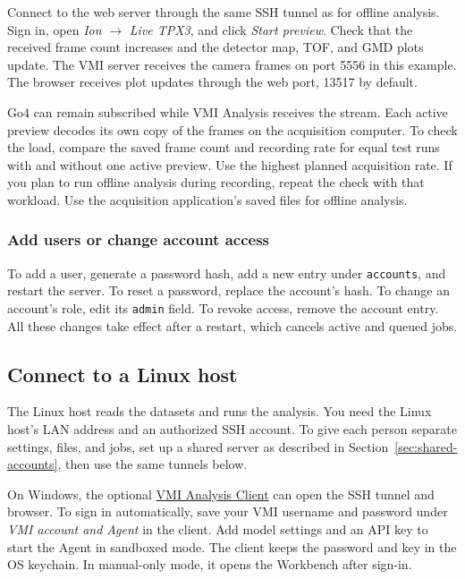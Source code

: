 \documentclass[11pt,a4paper]{article}
\newcommand{\code}[1]{\texttt{#1}}
\begin{document}
Connect to the web server through the same SSH tunnel as for offline analysis.
Sign in, open \emph{Ion} $\rightarrow$ \emph{Live TPX3}, and click
\emph{Start preview}. Check that the received frame count increases
and the detector map, TOF, and GMD plots update. The VMI server receives
the camera frames on port 5556 in this example. The browser receives plot
updates through the web port, 13517 by default.

Go4 can remain subscribed while VMI Analysis receives the stream.
Each active preview decodes its own copy of the frames on the acquisition computer.
To check the load, compare the saved frame count and recording rate for equal
test runs with and without one active preview. Use the highest planned
acquisition rate. If you plan to run offline analysis during recording,
repeat the check with that workload. Use the acquisition application's saved
files for offline analysis.

\subsubsection{Add users or change account access}

To add a user, generate a password hash, add a new entry under
\code{accounts}, and restart the server. To reset a password, replace the
account's hash. To change an account's role, edit its \code{admin} field.
To revoke access, remove the account entry. All these changes take effect
after a restart, which cancels active and queued jobs.

\subsection{Connect to a Linux host}
\label{sec:linux-mobaxterm}

The Linux host reads the datasets and runs the analysis. You need the
Linux host's LAN address and an authorized SSH account. To give each person
separate settings, files, and jobs, set up a shared server as described in
Section~\ref{sec:shared-accounts}, then use the same tunnels below.

On Windows, the optional
\href{https://github.com/jakiesumrain/vmi-analysis-client}{VMI Analysis Client}
can open the SSH tunnel and browser. To sign in automatically, save your VMI
username and password under \emph{VMI account and Agent} in the client.
Add model settings and an API key to start the Agent in sandboxed mode.
The client keeps the password and key in the OS keychain. In manual-only
mode, it opens the Workbench after sign-in.
\end{document}
